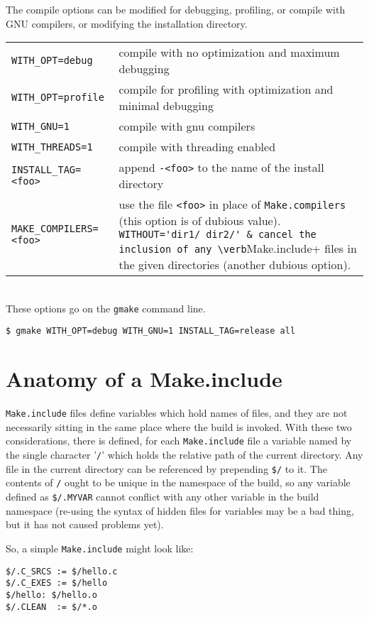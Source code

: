 \documentclass[letterpaper]{article}
\begin{document}
The compile options can be modified for debugging, profiling, or
compile with GNU compilers, or modifying the installation directory.\\
\begin{tabular}{ll}
\verb+WITH_OPT=debug+ & compile with no optimization and maximum debugging\\
\verb+WITH_OPT=profile+ & compile for profiling with optimization and minimal debugging\\
\verb+WITH_GNU=1+ & compile with gnu compilers\\
\verb+WITH_THREADS=1+ & compile with threading enabled\\
\verb+INSTALL_TAG=<foo>+ & append \verb+-<foo>+ to the name of the install directory\\
\verb+MAKE_COMPILERS=<foo>+ & use the file \verb+<foo>+ in place of \verb+Make.compilers+ (this option is of dubious value).
\verb+WITHOUT='dir1/ dir2/' & cancel the inclusion of any \verb+Make.include+ files in the given directories (another dubious option).
\end{tabular}\\
These options go on the \verb+gmake+ command line.
\begin{verbatim}
$ gmake WITH_OPT=debug WITH_GNU=1 INSTALL_TAG=release all
\end{verbatim}

\section{Anatomy of a Make.include}

\verb+Make.include+ files define variables which hold names of files,
and they are not
necessarily sitting in the same place where the build is invoked.  With
these two considerations, there is defined, for each
\verb+Make.include+ file a variable named by the single character
'\verb+/+' which holds the relative path of the current directory.
Any file in the current directory can be referenced by prepending
\verb+$/+ to it.  The contents of \verb+/+ ought to be unique in the
namespace of the build, so any variable defined as \verb+$/.MYVAR+
cannot conflict with any other variable in the build namespace (re-using
the syntax of hidden files for variables may be a bad thing, but it
has not caused problems yet).

So, a simple \verb+Make.include+ might look like:
\begin{verbatim}
$/.C_SRCS := $/hello.c
$/.C_EXES := $/hello
$/hello: $/hello.o
$/.CLEAN  := $/*.o
\end{verbatim}
\end{document}
